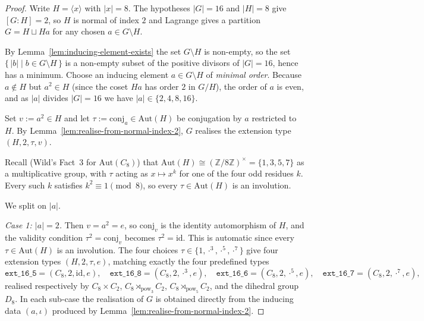 \begin{proof}
  Write $H = \langle x \rangle$ with $|x| = 8$. The hypotheses $|G| = 16$ and
  $|H| = 8$ give $[G : H] = 2$, so $H$ is normal of index $2$ and Lagrange
  gives a partition $G = H \sqcup Ha$ for any chosen
  $a \in G \setminus H$.

  By Lemma~\ref{lem:inducing-element-exists} the set $G \setminus H$ is
  non-empty, so the set
  $\{\,|b| \mid b \in G \setminus H\,\}$ is a non-empty subset of the positive
  divisors of $|G| = 16$, hence has a minimum. Choose an inducing element
  $a \in G \setminus H$ of \emph{minimal order}. Because $a \notin H$ but
  $a^2 \in H$ (since the coset $Ha$ has order $2$ in $G/H$), the order of $a$
  is even, and as $|a|$ divides $|G| = 16$ we have
  $|a| \in \{2, 4, 8, 16\}$.

  Set $v := a^2 \in H$ and let $\tau := \mathrm{conj}_a \in \mathrm{Aut}(H)$ be
  conjugation by $a$ restricted to $H$. By
  Lemma~\ref{lem:realise-from-normal-index-2}, $G$ realises the extension type
  $(H, 2, \tau, v)$.

  Recall (Wild's Fact~3 for $\mathrm{Aut}(C_8)$) that
  $\mathrm{Aut}(H) \cong (\mathbb{Z}/8\mathbb{Z})^\times =
  \{1, 3, 5, 7\}$ as a multiplicative group, with $\tau$ acting as $x \mapsto
  x^k$ for one of the four odd residues $k$. Every such $k$ satisfies
  $k^2 \equiv 1 \pmod 8$, so every $\tau \in \mathrm{Aut}(H)$ is an involution.

  We split on $|a|$.

  \smallskip
  \noindent
  \emph{Case 1: $|a| = 2$.} Then $v = a^2 = e$, so $\mathrm{conj}_v$ is the
  identity automorphism of $H$, and the validity condition $\tau^2 =
  \mathrm{conj}_v$ becomes $\tau^2 = \mathrm{id}$. This is automatic since every
  $\tau \in \mathrm{Aut}(H)$ is an involution. The four choices
  $\tau \in \{1, \cdot^3, \cdot^5, \cdot^7\}$ give four extension types
  $(H, 2, \tau, e)$, matching exactly the four predefined types
  \[
    \mathtt{ext\_16\_5} = (C_8, 2, \mathrm{id}, e),\quad
    \mathtt{ext\_16\_8} = (C_8, 2, \cdot^3, e),\quad
    \mathtt{ext\_16\_6} = (C_8, 2, \cdot^5, e),\quad
    \mathtt{ext\_16\_7} = (C_8, 2, \cdot^7, e),
  \]
  realised respectively by $C_8 \times C_2$, $C_8 \rtimes_{\mathrm{pow}_3} C_2$,
  $C_8 \rtimes_{\mathrm{pow}_5} C_2$, and the dihedral group $D_8$. In each
  sub-case the realisation of $G$ is obtained directly from the inducing data
  $(a, \iota)$ produced by
  Lemma~\ref{lem:realise-from-normal-index-2}.


\end{proof}
